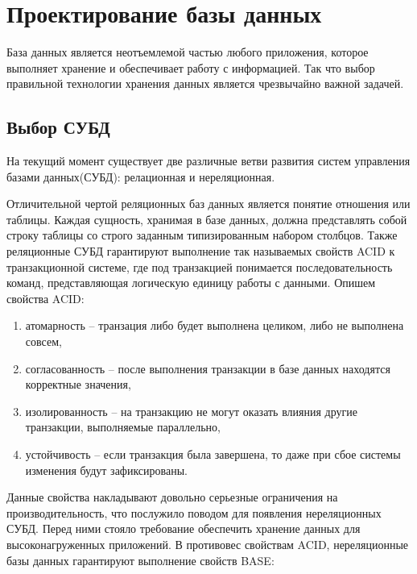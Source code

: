 \section*{Проектирование базы данных}

База данных является неотъемлемой частью любого приложения, которое выполняет
хранение и обеспечивает работу с информацией. Так что выбор правильной технологии
хранения данных является чрезвычайно важной задачей. 

\subsection*{Выбор СУБД}

На текущий момент существует две различные ветви развития систем управления
базами данных(СУБД): релационная и нереляционная.

Отличительной чертой реляционных баз данных является понятие отношения или таблицы.
Каждая сущность, хранимая в базе данных, должна представлять собой строку таблицы со 
строго заданным типизированным набором столбцов. Также реляционные СУБД гарантируют
выполнение так называемых свойств ACID к транзакционной системе, где под транзакцией
понимается последовательность команд, представляющая логическую единицу работы с данными.
Опишем свойства ACID: 

\begin{enumerate}
	\item атомарность -- транзация либо будет выполнена целиком, либо
	      не выполнена совсем,
	\item согласованность -- после выполнения транзакции в базе данных
	      находятся корректные значения,
	\item изолированность -- на транзакцию не могут оказать влияния другие транзакции,
	      выполняемые параллельно,
	\item устойчивость -- если транзакция была завершена, то даже при сбое системы
	      изменения будут зафиксированы.
\end{enumerate}

Данные свойства накладывают довольно серьезные ограничения на производительность, что
послужило поводом для появления нереляционных СУБД. Перед ними стояло требование
обеспечить хранение данных для высоконагруженных приложений. В противовес
свойствам ACID, нереляционные базы данных гарантируют выполнение свойств BASE\cite{GettingStartedWithNoSQL}:

